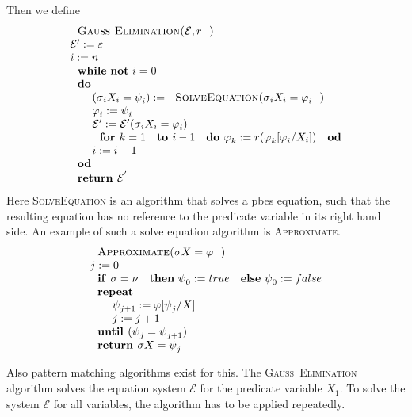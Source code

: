 \documentclass{article}
\begin{document}
Then we define%
\begin{equation*}
\begin{array}{l}
\text{\textsc{Gau\textsc{\ss\ }Elimination(}}\mathcal{E},r\text{\textsc{)}}
\\ 
\mathcal{E}^{\prime }:=\varepsilon \\ 
i:=n \\ 
\text{\textbf{while} \textbf{not} }i=0 \\ 
\text{\textbf{do}} \\ 
\qquad (\sigma _{i}X_{i}=\psi _{i}):=\text{\textsc{SolveEquation(}}\sigma
_{i}X_{i}=\varphi _{i}\text{\textsc{)}} \\ 
\qquad \varphi _{i}:=\psi _{i} \\ 
\qquad \mathcal{E}^{\prime }:=\mathcal{E}^{\prime }(\sigma _{i}X_{i}=\varphi
_{i}) \\ 
\qquad \text{\textbf{for }}k=1\text{ \textbf{to }}i-1\text{ \textbf{do }}%
\varphi _{k}:=r(\varphi _{k}[\varphi _{i}/X_{i}])\text{ \textbf{od}} \\ 
\qquad i:=i-1 \\ 
\text{\textbf{od}} \\ 
\text{\textbf{return }}\mathcal{E}^{^{\prime }}%
\end{array}%
\end{equation*}%
Here \textsc{SolveEquation} is an algorithm that solves a pbes equation,
such that the resulting equation has no reference to the predicate variable
in its right hand side. An example of such a solve equation algorithm is 
\textsc{Approximate}.%
\begin{equation*}
\begin{array}{l}
\text{\textsc{Approximate(}}\sigma X=\varphi \text{\textsc{)}} \\ 
j:=0 \\ 
\text{\textbf{if }}\sigma =\nu \text{ \textbf{then} }\psi _{0}:=true \text{ 
\textbf{else} }\psi _{0}:=false \\ 
\text{\textbf{repeat}} \\ 
\qquad \psi _{j+1}:=\varphi \lbrack \psi _{j}/X] \\ 
\qquad j:=j+1 \\ 
\text{\textbf{until }}(\psi _{j}=\psi _{j+1}) \\ 
\text{\textbf{return }}\sigma X=\psi _{j}%
\end{array}%
\end{equation*}

Also pattern matching algorithms exist for this. The \textsc{Gau\textsc{\ss\ 
}Elimination} algorithm solves the equation system $\mathcal{E}$ for the
predicate variable $X_{1}$. To solve the system $\mathcal{E}$ for all
variables, the algorithm has to be applied repeatedly.
\end{document}
